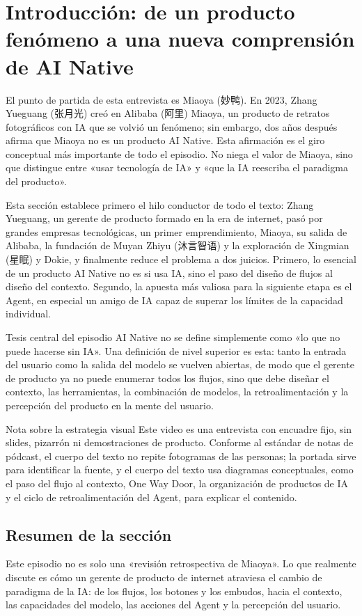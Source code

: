 \section{Introducción: de un producto fenómeno a una nueva comprensión de AI Native}

El punto de partida de esta entrevista es Miaoya (妙鸭). En 2023, Zhang Yueguang (张月光) creó en Alibaba (阿里) Miaoya, un producto de retratos fotográficos con IA que se volvió un fenómeno; sin embargo, dos años después afirma que Miaoya no es un producto AI Native. Esta afirmación es el giro conceptual más importante de todo el episodio. No niega el valor de Miaoya, sino que distingue entre «usar tecnología de IA» y «que la IA reescriba el paradigma del producto».

Esta sección establece primero el hilo conductor de todo el texto: Zhang Yueguang, un gerente de producto formado en la era de internet, pasó por grandes empresas tecnológicas, un primer emprendimiento, Miaoya, su salida de Alibaba, la fundación de Muyan Zhiyu (沐言智语) y la exploración de Xingmian (星眠) y Dokie, y finalmente reduce el problema a dos juicios. Primero, lo esencial de un producto AI Native no es si usa IA, sino el paso del diseño de flujos al diseño del contexto. Segundo, la apuesta más valiosa para la siguiente etapa es el Agent, en especial un amigo de IA capaz de superar los límites de la capacidad individual.

\begin{importantbox}{Tesis central del episodio}
AI Native no se define simplemente como «lo que no puede hacerse sin IA». Una definición de nivel superior es esta: tanto la entrada del usuario como la salida del modelo se vuelven abiertas, de modo que el gerente de producto ya no puede enumerar todos los flujos, sino que debe diseñar el contexto, las herramientas, la combinación de modelos, la retroalimentación y la percepción del producto en la mente del usuario.
\end{importantbox}

\begin{knowledgebox}{Nota sobre la estrategia visual}
Este video es una entrevista con encuadre fijo, sin slides, pizarrón ni demostraciones de producto. Conforme al estándar de notas de pódcast, el cuerpo del texto no repite fotogramas de las personas; la portada sirve para identificar la fuente, y el cuerpo del texto usa diagramas conceptuales, como el paso del flujo al contexto, One Way Door, la organización de productos de IA y el ciclo de retroalimentación del Agent, para explicar el contenido.
\end{knowledgebox}

\subsection{Resumen de la sección}

Este episodio no es solo una «revisión retrospectiva de Miaoya». Lo que realmente discute es cómo un gerente de producto de internet atraviesa el cambio de paradigma de la IA: de los flujos, los botones y los embudos, hacia el contexto, las capacidades del modelo, las acciones del Agent y la percepción del usuario.
